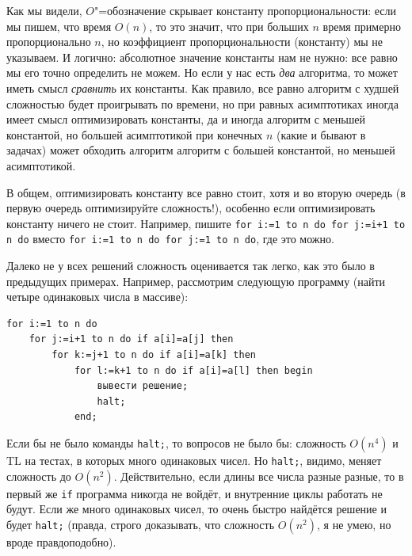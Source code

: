 \documentclass[a4paper,10pt]{problems}
\begin{document}
 Как мы видели, $O$"=обозначение скрывает константу 
пропорциональности: если мы пишем, что время $O(n)$, то это значит, что при 
больших $n$ время примерно пропорционально $n$, но коэффициент 
пропорциональности (константу) мы не указываем. И 
логично: абсолютное значение константы нам не нужно: все равно мы его точно 
определить не можем. Но если у нас есть \textit{два} алгоритма, то может иметь 
смысл \textit{сравнить} их константы. Как правило, все равно алгоритм с худшей 
сложностью будет проигрывать по времени, но при равных асимптотиках иногда имеет 
смысл оптимизировать константы, да и иногда алгоритм с меньшей константой, но 
большей асимптотикой при конечных $n$ (какие и бывают в задачах) может обходить 
алгоритм алгоритм с большей константой, но меньшей асимптотикой.

В общем, оптимизировать константу все равно стоит, хотя и во вторую очередь (в 
первую очередь оптимизируйте сложность!), особенно если оптимизировать 
константу ничего не стоит. Например, пишите \texttt{for i:=1 to n do for j:=i+1 to 
n do} вместо \texttt{for i:=1 to n do for j:=1 to n do}, где это можно.

 Далеко не у всех решений сложность 
оценивается так легко, как это было в предыдущих примерах. Например, рассмотрим 
следующую программу (найти четыре одинаковых числа в массиве):
\begin{codesample}\begin{verbatim}
for i:=1 to n do 
    for j:=i+1 to n do if a[i]=a[j] then
        for k:=j+1 to n do if a[i]=a[k] then
            for l:=k+1 to n do if a[i]=a[l] then begin
                вывести решение;
                halt;
            end;
\end{verbatim}\end{codesample}
Если бы не было команды \texttt{halt;}, то вопросов не было бы: сложность 
$O(n^4)$ и TL на тестах, в которых много одинаковых чисел. Но \texttt{halt;}, видимо, 
меняет сложность до $O(n^2)$. Действительно, если длины все числа разные
разные, то в первый же \texttt{if} программа никогда не войдёт, и внутренние циклы работать не будут. Если же много одинаковых 
чисел, то очень быстро найдётся решение и будет \texttt{halt;} (правда, строго 
доказывать, что сложность $O(n^2)$, я не умею, но вроде правдоподобно).

\end{document}

